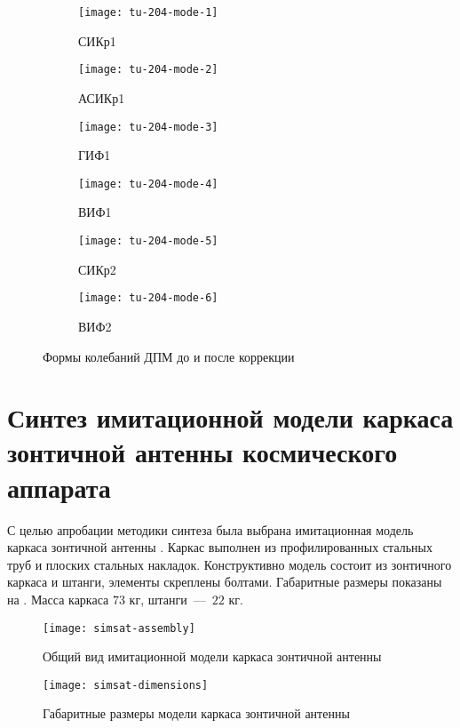 \begin{figure}[H]
	\centering
	\begin{subfigure}[b]{}
		\centering
		\texttt{[image: tu-204-mode-1]}
		\caption{СИКр1} 
	\end{subfigure}
	\begin{subfigure}[b]{}
		\centering
		\texttt{[image: tu-204-mode-2]}
		\caption{АСИКр1}
	\end{subfigure}
	\begin{subfigure}[b]{}
		\centering
		\texttt{[image: tu-204-mode-3]}
		\caption{ГИФ1}
	\end{subfigure}	
	\begin{subfigure}[b]{}
		\centering
		\texttt{[image: tu-204-mode-4]}
		\caption{ВИФ1}
	\end{subfigure}	
	\begin{subfigure}[b]{}
		\centering
		\texttt{[image: tu-204-mode-5]}
		\caption{СИКр2}
	\end{subfigure}
	\begin{subfigure}[b]{}
		\centering
		\texttt{[image: tu-204-mode-6]}
		\caption{ВИФ2} 
	\end{subfigure}
	\caption{Формы колебаний ДПМ до и после коррекции} \label{fig:tu-204-modes}
\end{figure}

\section{Синтез имитационной модели каркаса зонтичной антенны космического аппарата}

С целью апробации методики синтеза была выбрана имитационная модель каркаса зонтичной антенны . Каркас выполнен из профилированных стальных труб и плоских стальных накладок. Конструктивно модель состоит из зонтичного каркаса и штанги, элементы скреплены болтами. Габаритные размеры показаны на . Масса каркаса $ 73 $ кг, штанги~---~$ 22 $ кг.

\begin{figure}[!htb]
	\centerfloat
	\texttt{[image: simsat-assembly]}
	\caption{Общий вид имитационной модели каркаса зонтичной антенны} \label{fig:simsat-assembly}
\end{figure}

\begin{figure}[!htb]
	\centerfloat
	\texttt{[image: simsat-dimensions]}
	\caption{Габаритные размеры модели каркаса зонтичной антенны} \label{fig:simsat-dimensions}
\end{figure}

